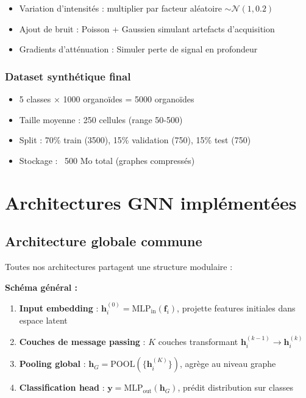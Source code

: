 \begin{itemize}
    \item Variation d'intensités : multiplier par facteur aléatoire $\sim \mathcal{N}(1, 0.2)$
    \item Ajout de bruit : Poisson + Gaussien simulant artefacts d'acquisition
    \item Gradients d'atténuation : Simuler perte de signal en profondeur
\end{itemize}

\subsubsection{Dataset synthétique final}

\begin{itemize}
    \item 5 classes × 1000 organoïdes = 5000 organoïdes
    \item Taille moyenne : 250 cellules (range 50-500)
    \item Split : 70\% train (3500), 15\% validation (750), 15\% test (750)
    \item Stockage : ~500 Mo total (graphes compressés)
\end{itemize}

\section{Architectures GNN implémentées}

\subsection{Architecture globale commune}

Toutes nos architectures partagent une structure modulaire :

\textbf{Schéma général :}
\begin{enumerate}
    \item \textbf{Input embedding} : $\mathbf{h}_i^{(0)} = \text{MLP}_{\text{in}}(\mathbf{f}_i)$, projette features initiales dans espace latent
    \item \textbf{Couches de message passing} : $K$ couches transformant $\mathbf{h}_i^{(k-1)} \rightarrow \mathbf{h}_i^{(k)}$
    \item \textbf{Pooling global} : $\mathbf{h}_G = \text{POOL}(\{\mathbf{h}_i^{(K)}\})$, agrège au niveau graphe
    \item \textbf{Classification head} : $\mathbf{y} = \text{MLP}_{\text{out}}(\mathbf{h}_G)$, prédit distribution sur classes
\end{enumerate}

